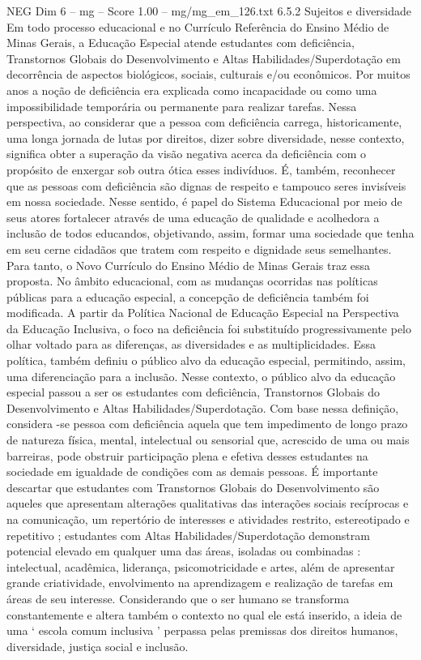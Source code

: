 \begin{textsample}{NEG Dim 6 – mg – Score 1.00 – mg/mg\_em\_126.txt}  \label{ex:f6_neg_046}
6.5.2 Sujeitos e diversidade Em todo processo educacional e no Currículo Referência do Ensino Médio de Minas Gerais, a Educação Especial atende estudantes com deficiência, Transtornos Globais do Desenvolvimento e Altas Habilidades/Superdotação em decorrência de aspectos biológicos, sociais, culturais e/ou econômicos.
Por muitos anos a noção de deficiência era explicada como incapacidade ou como uma impossibilidade temporária ou permanente para realizar tarefas.
Nessa perspectiva, ao considerar que a pessoa com deficiência carrega, historicamente, uma longa jornada de lutas por direitos, dizer sobre diversidade, nesse contexto, significa obter a superação da visão negativa acerca da deficiência com o propósito de enxergar sob outra ótica esses indivíduos.
É, também, reconhecer que as pessoas com deficiência são dignas de respeito e tampouco seres invisíveis em nossa sociedade.
Nesse sentido, é papel do Sistema Educacional por meio de seus atores fortalecer através de uma educação de qualidade e acolhedora a inclusão de todos educandos, objetivando, assim, formar uma sociedade que tenha em seu cerne cidadãos que tratem com respeito e dignidade seus semelhantes.
Para tanto, o Novo Currículo do Ensino Médio de Minas Gerais traz essa proposta.
No âmbito educacional, com as mudanças ocorridas nas políticas públicas para a educação especial, a concepção de deficiência também foi modificada.
A partir da Política Nacional de Educação Especial na Perspectiva da Educação Inclusiva, o foco na deficiência foi substituído progressivamente pelo olhar voltado para as diferenças, as diversidades e as multiplicidades.
Essa política, também definiu o público alvo da educação especial, permitindo, assim, uma diferenciação para a inclusão.
Nesse contexto, o público alvo da educação especial passou a ser os estudantes com deficiência, Transtornos Globais do Desenvolvimento e Altas Habilidades/Superdotação.
Com base nessa definição, considera -se pessoa com deficiência aquela que tem impedimento de longo prazo de natureza física, mental, intelectual ou sensorial que, acrescido de uma ou mais barreiras, pode obstruir participação plena e efetiva desses estudantes na sociedade em igualdade de condições com as demais pessoas.
É importante descartar que estudantes com Transtornos Globais do Desenvolvimento são aqueles que apresentam alterações qualitativas das interações sociais recíprocas e na comunicação, um repertório de interesses e atividades restrito, estereotipado e repetitivo ; estudantes com Altas Habilidades/Superdotação demonstram potencial elevado em qualquer uma das áreas, isoladas ou combinadas : intelectual, acadêmica, liderança, psicomotricidade e artes, além de apresentar grande criatividade, envolvimento na aprendizagem e realização de tarefas em áreas de seu interesse.
Considerando que o ser humano se transforma constantemente e altera também o contexto no qual ele está inserido, a ideia de uma ‘ escola comum inclusiva ’ perpassa pelas premissas dos direitos humanos, diversidade, justiça social e inclusão.

\end{textsample}
